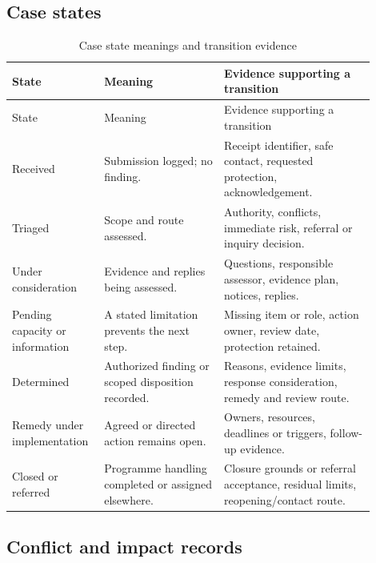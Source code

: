 \documentclass[11pt,a4paper]{article}
\begin{document}
\subsection{Case states}

\begin{longtable}{@{}L{0.20\linewidth}L{0.31\linewidth}L{0.39\linewidth}@{}}
\caption{Case state meanings and transition evidence}\label{tab:eip-states}\\
\toprule
State & Meaning & Evidence supporting a transition\\
\midrule\endfirsthead
\toprule
State & Meaning & Evidence supporting a transition\\
\midrule\endhead
Received & Submission logged; no finding. & Receipt identifier, safe contact, requested protection, acknowledgement.\\
Triaged & Scope and route assessed. & Authority, conflicts, immediate risk, referral or inquiry decision.\\
Under consideration & Evidence and replies being assessed. & Questions, responsible assessor, evidence plan, notices, replies.\\
Pending capacity or information & A stated limitation prevents the next step. & Missing item or role, action owner, review date, protection retained.\\
Determined & Authorized finding or scoped disposition recorded. & Reasons, evidence limits, response consideration, remedy and review route.\\
Remedy under implementation & Agreed or directed action remains open. & Owners, resources, deadlines or triggers, follow-up evidence.\\
Closed or referred & Programme handling completed or assigned elsewhere. & Closure grounds or referral acceptance, residual limits, reopening/contact route.\\
\bottomrule
\end{longtable}

\subsection{Conflict and impact records}
\end{document}
